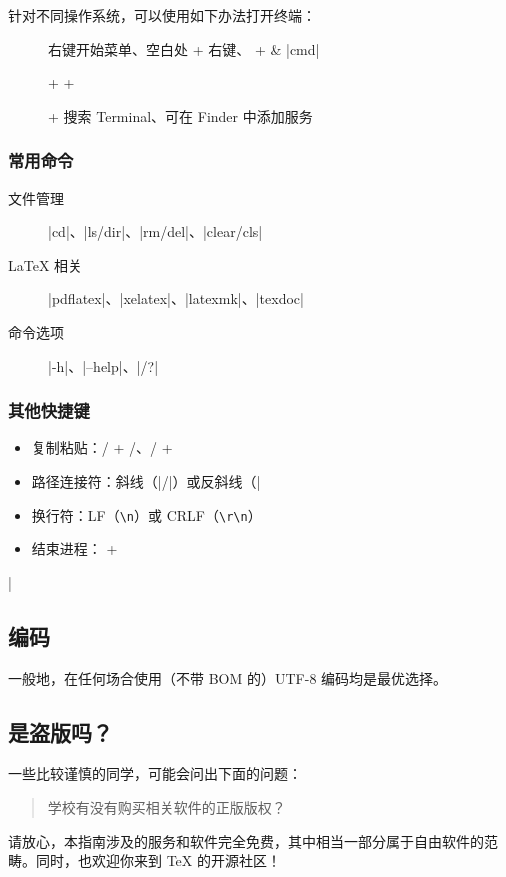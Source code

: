 针对不同操作系统，可以使用如下办法打开终端：

\begin{description}
  \item[\faWindows{}] 右键开始菜单、空白处  + 右键、 +  \& |cmd|
  \item[\faLinux{}]  +  + 
  \item[\faApple{}]  +  搜索 Terminal、可在 Finder 中添加服务
\end{description}

\subsubsection{常用命令}

\begin{description}
  \item[文件管理] |cd|、|ls/dir|、|rm/del|、|clear/cls|
  \item[\LaTeX{} 相关] |pdflatex|、|xelatex|、|latexmk|、|texdoc|
  \item[命令选项] |-h|、|--help|、|/?|
\end{description}

\subsubsection{其他快捷键}

\begin{itemize}
  \item 复制粘贴：/ + /、/ + 
  \item 路径连接符：斜线（|/|）或反斜线（|\|）
  \item 换行符：LF（\lstinline{\n}）或 CRLF（\lstinline{\r\n}）
  \item 结束进程： + 
\end{itemize}

\lstDeleteShortInline|

\subsection{编码}

一般地，在任何场合使用（不带 BOM 的）UTF-8 编码均是最优选择。

\subsection{是盗版吗？}

一些比较谨慎的同学，可能会问出下面的问题：
\begin{quote}
  \kaishu 学校有没有购买相关软件的正版版权？
\end{quote}

请放心，本指南涉及的服务和软件完全免费，其中相当一部分属于自由软件的范畴。同时，也欢迎你来到 \TeX{} 的开源社区！
